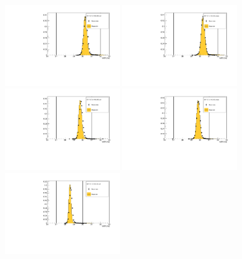 \begin{figure}[!tbh]
    \centering
    \includegraphics*[width=0.45\textwidth]{02-Cuts/Figures/2017-2.7_3-140_lH2_full/tof_tof01_us_cut.pdf}
    \includegraphics*[width=0.45\textwidth]{02-Cuts/Figures/2017-2.7_3-140_lH2_empty/tof_tof01_us_cut.pdf}
    \includegraphics*[width=0.45\textwidth]{02-Cuts/Figures/2017-2.7_6-140_lH2_full/tof_tof01_us_cut.pdf}
    \includegraphics*[width=0.45\textwidth]{02-Cuts/Figures/2017-2.7_6-140_lH2_empty/tof_tof01_us_cut.pdf}
    \includegraphics*[width=0.45\textwidth]{02-Cuts/Figures/2017-2.7_10-140_lH2_full/tof_tof01_us_cut.pdf}

\end{figure}
